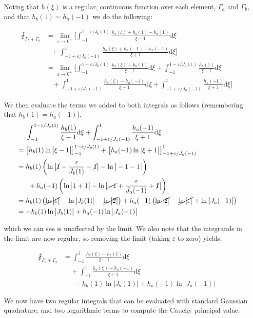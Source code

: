 Noting that $h(\xi)$ is a regular, continuous function over each element, $\Gamma_a$ and $\Gamma_b$, and that $h_b(1) = h_a(-1)$ we do the following:

\[
\begin{aligned}
\fint_{\Gamma_b + \Gamma_a} &= 
\lim_{ \varepsilon \rightarrow 0^+} 
\biggl[ 
\int_{-1}^{1 -\varepsilon/J_b(1)} \frac{h_b(\xi)+h_b(1)-h_b(1)}{\xi-1} \mathrm{d}\xi \\
&~~~ +\int_{-1 + \varepsilon/J_a(-1)}^{1} \frac{h_a(\xi)+h_a(-1)-h_a(-1)}{\xi+1} \mathrm{d}\xi 
\biggr] \\
&= 
\lim_{ \varepsilon \rightarrow 0^+} 
\biggl[
\int_{-1}^{1 -\varepsilon/J_b(1)} \frac{h_b(\xi)-h_b(1)}{\xi-1} \mathrm{d}\xi + \int_{-1}^{1 -\varepsilon/J_b(1)} \frac{h_b(1)}{\xi-1} \mathrm{d}\xi\\
&~~~~+
\int_{-1 + \varepsilon/J_a(-1)}^{1} \frac{h_a(\xi)-h_a(-1)}{\xi+1} \mathrm{d}\xi + \int_{-1 + \varepsilon/J_a(-1)}^{1} \frac{h_a(-1)}{\xi+1} \mathrm{d}\xi
\biggr]
\end{aligned}
\]

We then evaluate the terms we added to both integrals as follows (remembering that $h_b(1) = h_a(-1)$).
\[
\begin{aligned}
& ~~~~\int_{-1}^{1 -\varepsilon/J_b(1)} \frac{h_b(1)}{\xi-1} \mathrm{d}\xi + \int_{-1 + \varepsilon/J_a(-1)}^{1} \frac{h_a(-1)}{\xi+1} \mathrm{d}\xi  \\
&=\left[ h_b(1) \ln\big|\xi-1\big|\right]_{-1}^{1 -\varepsilon/J_b(1)} + \left[ h_a(-1)\ln\big|\xi+1\big|\right]_{-1 + \varepsilon/J_a(-1)}^{1} \\
&= h_b(1)\left(\ln\big|\cancel{1}-\frac{\varepsilon}{J_b(1)} - \cancel{1}\big| - \ln\big|-1-1\big| \right) \\
&~~~~~+ h_a(-1)\left(\ln\big|1+1\big| - \ln\big|\cancel{-1}+\frac{\varepsilon}{J_a(-1)} + \cancel{1}\big| \right)
\\
&= h_b(1)\left(\cancel{\ln\big|\varepsilon\big|} - \ln\big|J_b(1) \big| - \cancel{\ln\big|2\big|} \right) + h_a(-1)\left(\cancel{\ln\big|2\big|} - \cancel{\ln\big|\varepsilon\big|} + \ln\big|J_a(-1)\big| \right)\\
& = -h_b(1) \ln \big|J_b(1)\big| +h_a(-1) \ln \big|J_a(-1)\big|
\end{aligned}
\]

which we can see is unaffected by the limit. We also note that the integrands in the limit are now regular, so removing the limit (taking $\varepsilon$ to zero) yields.

\begin{equation}
\begin{split}
\fint_{\Gamma_b + \Gamma_a} &= \int_{-1}^{1} \frac{h_b(\xi)-h_b(1)}{\xi-1} \mathrm{d}\xi \\
&~~~~~+ \int_{-1}^{1} \frac{h_a(\xi)-h_a(-1)}{\xi+1} \mathrm{d}\xi\\ 
&~~~~~~~- h_b(1) \ln \big|J_b(1)\big| + h_a(-1) \ln \big|J_a(-1)\big|
\end{split}
\end{equation}

We now have two regular integrals that can be evaluated with standard Gaussian quadrature, and two logarithmic terms to compute the Cauchy principal value.


  
 {}

 
